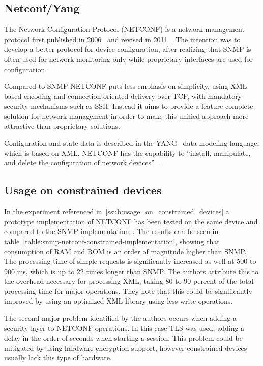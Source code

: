 \documentclass[conference]{IEEEtran}
\begin{document}



\subsection{Netconf/Yang} %
\label{sub:netconf_yang}
The Network Configuration Protocol (NETCONF) is a network management protocol first published in 2006~\cite{rfc4741} and revised in 2011~\cite{rfc6241}. The intention was to develop a better protocol for device configuration, after realizing that SNMP is often used for network monitoring only while proprietary interfaces are used for configuration.

Compared to SNMP NETCONF puts less emphasis on simplicity, using XML based encoding and connection-oriented delivery over TCP, with mandatory security mechanisms such as SSH. Instead it aims to provide a feature-complete solution for network management in order to make this unified approach more attractive than proprietary solutions.

Configuration and state data is described in the YANG~\cite{rfc6020} data modeling language, which is based on XML. NETCONF has the capability to ``install, manipulate, and delete the configuration of network devices''~\cite{rfc6241}.


\subsection{Usage on constrained devices } %
\label{ssub:usage_on_constrained_devices_}
In the experiment referenced in~\ref{ssub:usage_on_constrained_devices} a prototype implementation of NETCONF has been tested on the same device and compared to the SNMP implementation~\cite{mgmt-constrained-iot}. The results can be seen in table~\ref{table:snmp-netconf-constrained-implementation}, showing that consumption of RAM and ROM is an order of magnitude higher than SNMP. The processing time of simple requests is significantly increased as well at 500 to 900 ms, which is up to 22 times longer than SNMP. The authors attribute this to the overhead necessary for processing XML, taking 80 to 90 percent of the total processing time for major operations. They note that this could be significantly improved by using an optimized XML library using less write operations. 

The second major problem identified by the authors occurs when adding a security layer to NETCONF operations. In this case TLS was used, adding a delay in the order of seconds when starting a session. This problem could be mitigated by using hardware encryption support, however constrained devices usually lack this type of hardware. 
\end{document}
